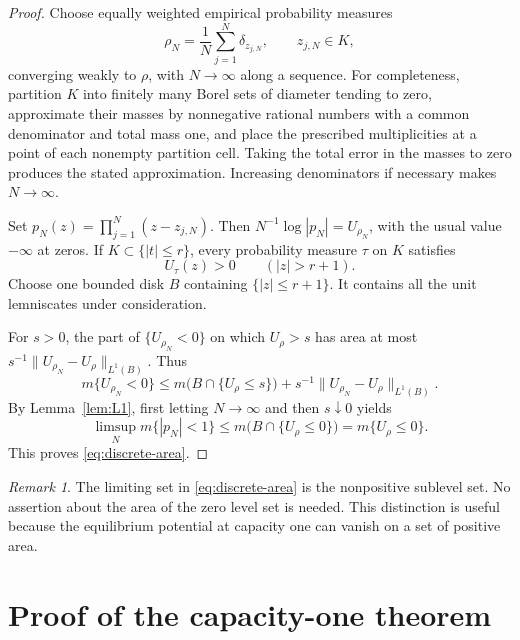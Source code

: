 \documentclass[11pt]{article}
\theoremstyle{remark}
\newtheorem{remark}[theorem]{Remark}
\numberwithin{equation}{section}
\begin{document}
\begin{proof}
Choose equally weighted empirical probability measures
\[
 \rho_N=\frac1N\sum_{j=1}^N\delta_{z_{j,N}},\qquad z_{j,N}\in K,
\]
converging weakly to $\rho$, with $N\to\infty$ along a sequence.
For completeness, partition $K$ into finitely many Borel sets of
diameter tending to zero, approximate their masses by nonnegative
rational numbers with a common denominator and total mass one, and
place the prescribed multiplicities at a point of each nonempty
partition cell. Taking the total error in the masses to zero produces
the stated approximation. Increasing denominators if necessary makes
$N\to\infty$.

Set $p_N(z)=\prod_{j=1}^N(z-z_{j,N})$. Then
$N^{-1}\log|p_N|=U_{\rho_N}$, with the usual value $-\infty$ at
zeros. If $K\subset\{|t|\le r\}$, every probability measure
$\tau$ on $K$ satisfies
\begin{equation}\label{eq:bounding-disk}
 U_\tau(z)>0\qquad(|z|>r+1).
\end{equation}
Choose one bounded disk $B$ containing $\{|z|\le r+1\}$.
It contains all the unit lemniscates under consideration.

For $s>0$, the part of $\{U_{\rho_N}<0\}$ on which $U_\rho>s$
has area at most $s^{-1}\|U_{\rho_N}-U_\rho\|_{L^1(B)}$.
Thus
\[
 m\{U_{\rho_N}<0\}
 \le m\bigl(B\cap\{U_\rho\le s\}\bigr)
       +s^{-1}\|U_{\rho_N}-U_\rho\|_{L^1(B)}.
\]
By Lemma~\ref{lem:L1}, first letting $N\to\infty$ and then
$s\downarrow0$ yields
\[
 \limsup_N m\{|p_N|<1\}
 \le m\bigl(B\cap\{U_\rho\le0\}\bigr)
 =m\{U_\rho\le0\}.
\]
This proves \eqref{eq:discrete-area}.
\end{proof}

\begin{remark}
The limiting set in \eqref{eq:discrete-area} is the nonpositive
sublevel set. No assertion about the area of the zero level set is
needed. This distinction is useful because the equilibrium potential
at capacity one can vanish on a set of positive area.
\end{remark}

\section{Proof of the capacity-one theorem}
\label{sec:proof}
\end{document}
